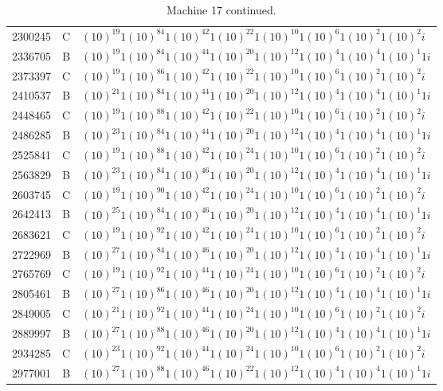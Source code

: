 \documentclass[12pt]{article}
\begin{document}
\begin{table}[H]
\begin{Parallel}[c]{0.48\textwidth}{0.48\textwidth}
{{\begin{tiny}
\begin{tabular}{rrl}
2300245&C&$(10)^{19}1(10)^{84}1(10)^{42}1(10)^{22}1(10)^{10}1(10)^{6}1(10)^{2}1(10)^{2}i$\\
2336705&B&$(10)^{19}1(10)^{84}1(10)^{44}1(10)^{20}1(10)^{12}1(10)^{4}1(10)^{4}1(10)^{1}1i$\\
2373397&C&$(10)^{19}1(10)^{86}1(10)^{42}1(10)^{22}1(10)^{10}1(10)^{6}1(10)^{2}1(10)^{2}i$\\
2410537&B&$(10)^{21}1(10)^{84}1(10)^{44}1(10)^{20}1(10)^{12}1(10)^{4}1(10)^{4}1(10)^{1}1i$\\
2448465&C&$(10)^{19}1(10)^{88}1(10)^{42}1(10)^{22}1(10)^{10}1(10)^{6}1(10)^{2}1(10)^{2}i$\\
2486285&B&$(10)^{23}1(10)^{84}1(10)^{44}1(10)^{20}1(10)^{12}1(10)^{4}1(10)^{4}1(10)^{1}1i$\\
2525841&C&$(10)^{19}1(10)^{88}1(10)^{42}1(10)^{24}1(10)^{10}1(10)^{6}1(10)^{2}1(10)^{2}i$\\
2563829&B&$(10)^{23}1(10)^{84}1(10)^{46}1(10)^{20}1(10)^{12}1(10)^{4}1(10)^{4}1(10)^{1}1i$\\
2603745&C&$(10)^{19}1(10)^{90}1(10)^{42}1(10)^{24}1(10)^{10}1(10)^{6}1(10)^{2}1(10)^{2}i$\\
2642413&B&$(10)^{25}1(10)^{84}1(10)^{46}1(10)^{20}1(10)^{12}1(10)^{4}1(10)^{4}1(10)^{1}1i$\\
2683621&C&$(10)^{19}1(10)^{92}1(10)^{42}1(10)^{24}1(10)^{10}1(10)^{6}1(10)^{2}1(10)^{2}i$\\
2722969&B&$(10)^{27}1(10)^{84}1(10)^{46}1(10)^{20}1(10)^{12}1(10)^{4}1(10)^{4}1(10)^{1}1i$\\
2765769&C&$(10)^{19}1(10)^{92}1(10)^{44}1(10)^{24}1(10)^{10}1(10)^{6}1(10)^{2}1(10)^{2}i$\\
2805461&B&$(10)^{27}1(10)^{86}1(10)^{46}1(10)^{20}1(10)^{12}1(10)^{4}1(10)^{4}1(10)^{1}1i$\\
2849005&C&$(10)^{21}1(10)^{92}1(10)^{44}1(10)^{24}1(10)^{10}1(10)^{6}1(10)^{2}1(10)^{2}i$\\
2889997&B&$(10)^{27}1(10)^{88}1(10)^{46}1(10)^{20}1(10)^{12}1(10)^{4}1(10)^{4}1(10)^{1}1i$\\
2934285&C&$(10)^{23}1(10)^{92}1(10)^{44}1(10)^{24}1(10)^{10}1(10)^{6}1(10)^{2}1(10)^{2}i$\\
2977001&B&$(10)^{27}1(10)^{88}1(10)^{46}1(10)^{22}1(10)^{12}1(10)^{4}1(10)^{4}1(10)^{1}1i$\\
\end{tabular}
\end{tiny}}}
\end{Parallel}
\caption{\label{tab:17}Machine 17 continued.}
\end{table}
\end{document}
